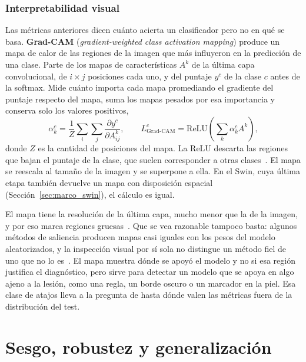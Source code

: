 \subsubsection{Interpretabilidad visual}
\label{sec:marco_eval_gradcam}
\setcounter{secnumdepth}{2}

Las métricas anteriores dicen cuánto acierta un clasificador pero no en qué se basa. \textbf{Grad-CAM}
(\emph{gradient-weighted class activation mapping}) produce un mapa de calor de las regiones de la imagen que
más influyeron en la predicción de una clase. Parte de los mapas de características $A^k$ de la última capa
convolucional, de $i \times j$ posiciones cada uno, y del puntaje $y^c$ de la clase $c$ antes de la softmax.
Mide cuánto importa cada mapa promediando el gradiente del puntaje respecto del mapa, suma los mapas pesados
por esa importancia y conserva solo los valores positivos,
\begin{equation}
    \alpha_k^c = \frac{1}{Z}\sum_{i}\sum_{j} \frac{\partial y^c}{\partial A^k_{ij}}, \qquad
    L^c_{\text{Grad-CAM}} = \mathrm{ReLU}\!\left(\sum_k \alpha_k^c A^k\right),
    \label{eq:marco_gradcam}
\end{equation}
donde $Z$ es la cantidad de posiciones del mapa. La ReLU descarta las regiones que bajan el puntaje de la
clase, que suelen corresponder a otras clases~\cite{selvaraju2017gradcam}. El mapa se reescala al tamaño de
la imagen y se superpone a ella. En el Swin, cuya última etapa también devuelve un mapa con disposición
espacial (Sección~\ref{sec:marco_swin}), el cálculo es igual.

El mapa tiene la resolución de la última capa, mucho menor que la de la imagen, y por eso marca regiones
gruesas~\cite{selvaraju2017gradcam}. Que se vea razonable tampoco basta: algunos métodos de saliencia
producen mapas casi iguales con los pesos del modelo aleatorizados, y la inspección visual por sí sola no
distingue un método fiel de uno que no lo es~\cite{adebayo2018sanity}. El mapa muestra dónde se apoyó el
modelo y no si esa región justifica el diagnóstico, pero sirve para detectar un modelo que se apoya en algo
ajeno a la lesión, como una regla, un borde oscuro o un marcador en la piel. Esa clase de atajos lleva a la
pregunta de hasta dónde valen las métricas fuera de la distribución del test.

\section{Sesgo, robustez y generalización}
\label{sec:marco_generalizacion}


